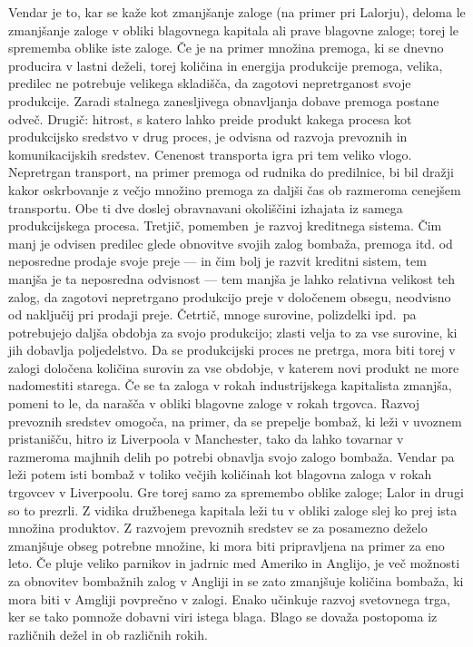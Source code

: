 \documentclass[kapital_02.tex]{subfiles}
\begin{document}
Vendar je to, kar se kaže kot zmanjšanje zaloge (na primer pri Lalorju), deloma le zmanjšanje zaloge v obliki blagovnega kapitala ali prave blagovne zaloge; torej le sprememba oblike iste zaloge.
Če je na primer množina premoga, ki se dnevno producira v lastni deželi, torej količina in energija produkcije premoga, velika, predilec ne potrebuje velikega skladišča, da zagotovi nepretrganost svoje produkcije.
Zaradi stalnega zanesljivega obnavljanja dobave premoga postane odveč.
Drugič: hitrost, s katero lahko preide produkt kakega procesa kot produkcijsko sredstvo v drug proces, je odvisna od razvoja prevoznih in komunikacijskih sredstev.
Cenenost transporta igra pri tem veliko vlogo.
Nepretrgan transport, na primer premoga od rudnika do predilnice, bi bil dražji kakor oskrbovanje z večjo množino premoga za daljši čas ob razmeroma cenejšem transportu.
Obe ti dve doslej obravnavani okoliščini izhajata iz samega produkcijskega procesa.
Tretjič, pomemben\KPEstran\ je razvoj kreditnega sistema.
Čim manj je odvisen predilec glede obnovitve svojih zalog bombaža, premoga itd. od neposredne prodaje svoje preje — in čim bolj je razvit kreditni sistem, tem manjša je ta neposredna odvisnost — tem manjša je lahko relativna velikost teh zalog, da zagotovi nepretrgano produkcijo preje v določenem obsegu, neodvisno od naključij pri prodaji preje.
Četrtič, mnoge surovine, polizdelki ipd.\ pa potrebujejo daljša obdobja za svojo produkcijo; zlasti velja to za vse surovine, ki jih dobavlja poljedelstvo.
Da se produkcijski proces ne pretrga, mora biti torej v zalogi določena količina surovin za vse obdobje, v katerem novi produkt ne more nadomestiti starega.
Če se ta zaloga v rokah industrijskega kapitalista zmanjša, pomeni to le, da narašča v obliki blagovne zaloge v rokah trgovca.
Razvoj prevoznih sredstev omogoča, na primer, da se prepelje bombaž, ki leži v uvoznem pristanišču, hitro iz Liverpoola v Manchester, tako da lahko tovarnar v razmeroma majhnih delih po potrebi obnavlja svojo zalogo bombaža.
Vendar pa leži potem isti bombaž v toliko večjih količinah kot blagovna zaloga v rokah trgovcev v Liverpoolu.
Gre torej samo za spremembo oblike zaloge; Lalor in drugi so to prezrli.
Z vidika družbenega kapitala leži tu v obliki zaloge slej ko prej ista množina produktov.
Z razvojem prevoznih sredstev se za posamezno deželo zmanjšuje obseg potrebne množine, ki mora biti pripravljena na primer za eno leto.
Če pluje veliko parnikov in jadrnic med Ameriko in Anglijo, je več možnosti za obnovitev bombažnih zalog v Angliji in se zato zmanjšuje količina bombaža, ki mora biti v Amgliji povprečno v zalogi.
Enako učinkuje razvoj svetovnega trga, ker se tako pomnože dobavni viri istega blaga.
Blago se dovaža postopoma iz različnih dežel in ob različnih rokih.
\end{document}
